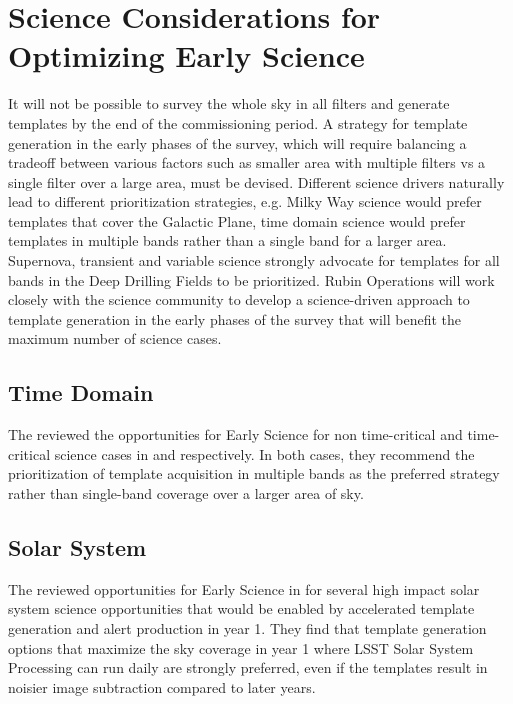 \section{Science Considerations for Optimizing Early Science} \label{sec:science}

It will not be possible to survey the whole sky in all filters and generate templates by the end of the commissioning period.
A strategy for template generation in the early phases of the survey, which will require balancing a tradeoff between various factors such as smaller area with multiple filters vs a single filter over a large area, must be devised.
Different science drivers naturally lead to different prioritization strategies, e.g. Milky Way science would prefer templates that cover the Galactic Plane, time domain science would prefer templates in multiple bands rather than a single band for a larger area.
Supernova, transient and variable science strongly advocate for templates for all bands in the Deep Drilling Fields to be prioritized.
Rubin Operations will work closely with the science community to develop a science-driven approach to template generation in the early phases of the survey that will benefit the maximum number of science cases.

\subsection{Time Domain}

The \tvssc reviewed the opportunities for Early Science  for non time-critical and time-critical science cases in \citep{Hambleton_2020} and \citep{Street_2020} respectively.
In both cases, they recommend the prioritization of template acquisition in multiple bands as the preferred strategy rather than single-band  coverage over a larger area of sky.

\subsection{Solar System}

The \sssc reviewed opportunities for Early Science  in \citep{2020arXiv201005926L} for several high impact solar system science opportunities that would be enabled by accelerated template generation and alert production in year 1.
They find that template generation options that maximize the sky coverage in year 1 where LSST Solar System Processing can run daily are strongly preferred, even if the templates result in noisier image subtraction compared to later years.

